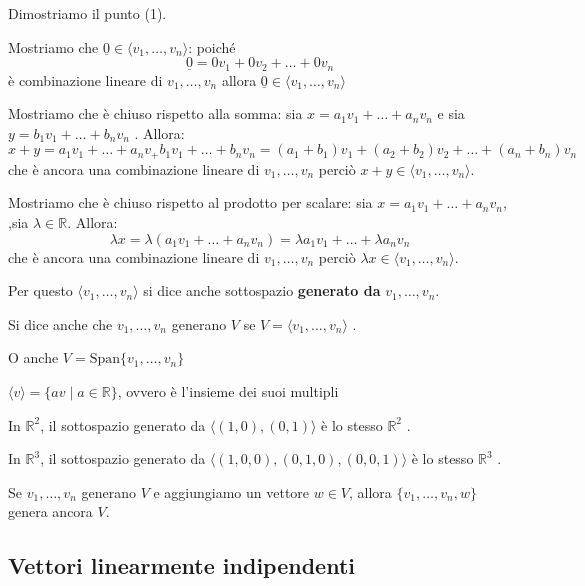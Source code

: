 \documentclass[
  a4paper,
]{article}
\begin{document}
\begin{proofbox}
Dimostriamo il punto (1).

Mostriamo che \(\underline{0} \in \langle v_1,\ldots,v_n\rangle\):
poiché \[
\underline{0} = 0 v_1 + 0 v_2 + \dots + 0 v_n
\] è combinazione lineare di \(v_1, \dots, v_n\) allora
\(\underline{0} \in \langle v_1,\ldots,v_n\rangle\)

Mostriamo che è chiuso rispetto alla somma: sia
\(x = a_1 v_1 + \dots + a_n v_n\) e sia
\(y = b_1 v_1 + \dots + b_n v_n\) . Allora: \[
x + y = a_1 v_1 + \dots + a_n v_ +  b_1 v_1 + \dots + b_n v_n = (a_1 + b_1)v_1 + (a_2 + b_2) v_2 + \dots + (a_n + b_n) v_n
\] che è ancora una combinazione lineare di \(v_1, \dots, v_n\) perciò
\(x + y \in \langle v_1,\ldots,v_n\rangle\).

Mostriamo che è chiuso rispetto al prodotto per scalare: sia
\(x = a_1 v_1 + \dots + a_n v_n\), ,sia \(\lambda \in \mathbb{R}\).
Allora: \[
\lambda x = \lambda (a_1 v_1 + \dots + a_n v_n) = \lambda a_1 v_1 + \dots + \lambda a_n v_n
\] che è ancora una combinazione lineare di \(v_1, \dots, v_n\) perciò
\(\lambda x \in \langle v_1,\ldots,v_n\rangle\).
\end{proofbox}

Per questo \(\langle v_1, \dots, v_n \rangle\) si dice anche sottospazio
\textbf{generato da} \(v_1, \dots, v_n\).

Si dice anche che \(v_1, \dots, v_n\) generano \(V\) se
\(V = \langle v_1, \dots, v_n \rangle\) .

O anche \(V = \text{Span}\{v_1, \dots, v_n\}\)

\begin{observationbox}
\(\langle v \rangle = \{av \mid a \in \mathbb{R}\}\), ovvero è l'insieme
dei suoi multipli
\end{observationbox}

In \(\mathbb{R}^2\), il sottospazio generato da
\(\langle (1, 0), (0, 1) \rangle\) è lo stesso \(\mathbb{R}^2\) .

In \(\mathbb{R}^3\), il sottospazio generato da
\(\langle (1, 0, 0), (0, 1, 0), (0, 0, 1) \rangle\) è lo stesso
\(\mathbb{R}^3\) .

\begin{observationbox}
Se \(v_1, \dots ,v_n\) generano \(V\) e aggiungiamo un vettore
\(w \in V\), allora \(\{ v_1, \dots , v_n, w \}\) genera ancora \(V\).
\end{observationbox}

\hypertarget{vettori-linearmente-indipendenti}{%
\subsection{Vettori linearmente
indipendenti}\label{vettori-linearmente-indipendenti}}
\end{document}
